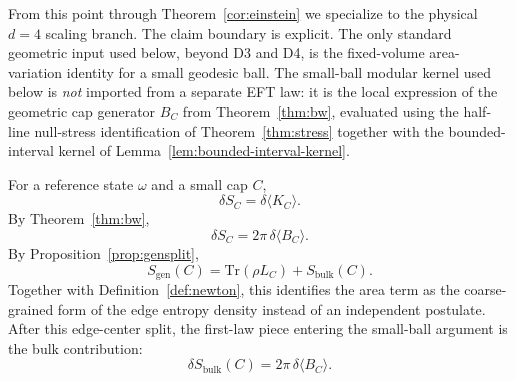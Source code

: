 \documentclass[11pt]{article}
\begin{document}
From this point through Theorem~\ref{cor:einstein} we specialize to the physical $d=4$ scaling branch. The claim boundary is explicit. The only standard geometric input used below, beyond D3 and D4, is the fixed-volume area-variation identity for a small geodesic ball. The small-ball modular kernel used below is \emph{not} imported from a separate EFT law: it is the local expression of the geometric cap generator $B_C$ from Theorem~\ref{thm:bw}, evaluated using the half-line null-stress identification of Theorem~\ref{thm:stress} together with the bounded-interval kernel of Lemma~\ref{lem:bounded-interval-kernel}.

For a reference state $\omega$ and a small cap $C$,
\[
\delta S_C=\delta \langle K_C\rangle.
\]
By Theorem~\ref{thm:bw},
\[
\delta S_C = 2\pi\,\delta\langle B_C\rangle.
\]
By Proposition~\ref{prop:gensplit},
\[
S_{\mathrm{gen}}(C)=\mathrm{Tr}(\rho L_C)+S_{\mathrm{bulk}}(C).
\]
Together with Definition~\ref{def:newton}, this identifies the area term as the coarse-grained form of the edge entropy density instead of an independent postulate. After this edge-center split, the first-law piece entering the small-ball argument is the bulk contribution:
\[
\delta S_{\mathrm{bulk}}(C)=2\pi\,\delta\langle B_C\rangle.
\]
\end{document}
